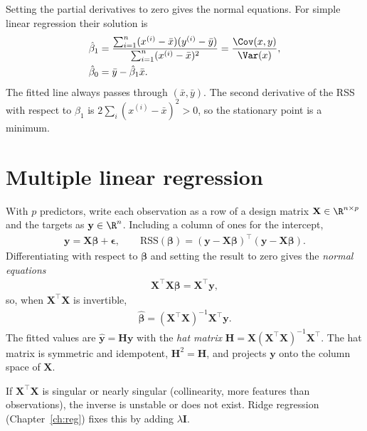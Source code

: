 \documentclass[a4paper, 12pt]{book}
\begin{document}
Setting the partial derivatives to zero gives the normal equations. For simple
linear regression their solution is
\begin{align}
    \hat{\beta}_1
    &= \frac{\sum_{i=1}^n (x^{(i)} - \bar{x})(y^{(i)} - \bar{y})}
              {\sum_{i=1}^n (x^{(i)} - \bar{x})^2}
    = \frac{\Cov(x,y)}{\Var(x)},\\
    \hat{\beta}_0 &= \bar{y} - \hat{\beta}_1 \bar{x}.
\end{align}
The fitted line always passes through $(\bar{x},\bar{y})$. The second derivative of
the RSS with respect to $\beta_1$ is $2\sum_i (x^{(i)}-\bar{x})^2 > 0$, so the
stationary point is a minimum.

\section{Multiple linear regression}

With $p$ predictors, write each observation as a row of a design matrix
$\mathbf{X} \in \R^{n \times p}$ and the targets as
$\mathbf{y} \in \R^n$. Including a column of ones for the intercept,
\begin{align}
    \mathbf{y} = \mathbf{X}\boldsymbol{\beta} + \boldsymbol{\epsilon},
    \qquad
    \mathrm{RSS}(\boldsymbol{\beta})
    = (\mathbf{y} - \mathbf{X}\boldsymbol{\beta})^\top
      (\mathbf{y} - \mathbf{X}\boldsymbol{\beta}).
\end{align}
Differentiating with respect to $\boldsymbol{\beta}$ and setting the result to zero
gives the \emph{normal equations}
\begin{align}
    \mathbf{X}^\top\mathbf{X}\boldsymbol{\beta}
    = \mathbf{X}^\top\mathbf{y},
\end{align}
so, when $\mathbf{X}^\top\mathbf{X}$ is invertible,
\begin{align}
    \hat{\boldsymbol{\beta}}
    = (\mathbf{X}^\top\mathbf{X})^{-1}\mathbf{X}^\top\mathbf{y}.
\end{align}
The fitted values are $\hat{\mathbf{y}} = \mathbf{H}\mathbf{y}$ with the \emph{hat
matrix} $\mathbf{H} = \mathbf{X}(\mathbf{X}^\top\mathbf{X})^{-1}\mathbf{X}^\top$.
The hat matrix is symmetric and idempotent, $\mathbf{H}^2=\mathbf{H}$, and projects
$\mathbf{y}$ onto the column space of $\mathbf{X}$.

If $\mathbf{X}^\top\mathbf{X}$ is singular or nearly singular (collinearity, more
features than observations), the inverse is unstable or does not exist. Ridge
regression (Chapter~\ref{ch:reg}) fixes this by adding $\lambda\mathbf{I}$.
\end{document}
